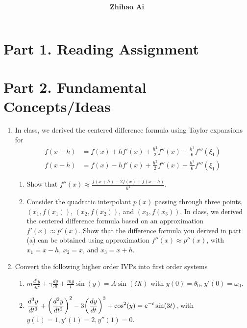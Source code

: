 \documentclass[10pt]{report}
\title{
	\vspace{2in}
	\textmd{\textbf{\hwCourse\\\hwTitle}}\\
	\vspace{0.3in}\large{\textit{\hmwkClassInstructor}}
	\vspace{3in}
}
\author{\textbf{Zhihao Ai}}
\date{}
\newcommand{\ds}{\displaystyle}
\DeclarePairedDelimiter\autoparen{(}{)}
\newcommand{\pa}[1]{\autoparen*{#1}}
\begin{document}
\maketitle

\section*{Part 1. Reading Assignment}

\section*{Part 2. Fundamental Concepts/Ideas}
\begin{enumerate}
	\item 
	In class, we derived the centered difference formula using Taylor expansions for
	\begin{align*}
		f(x+h) &= f(x) + hf'(x) + \frac{h^2}{2}f''(x) + \frac{h^3}{6}f'''(\xi_1)\\
		f(x-h) &= f(x) - hf'(x) + \frac{h^2}{2}f''(x) - \frac{h^3}{6}f'''(\xi_1)
	\end{align*}
	\begin{enumerate}
		\item 
		Show that $f''(x) \approx \frac{f(x+h) - 2f(x) + f(x-h)}{h^2}$.
		
		\item
		Consider the quadratic interpolant $p(x)$ passing through three points, $(x_1, f(x_1))$, $(x_2, f(x_2))$, and $(x_3, f(x_3))$. In class, we derived the centered
		difference formula based on an approximation $f'(x) \approx p'(x)$. Show that the difference formula you derived in part (a) can be obtained using approximation $f''(x) \approx p''(x)$, with $x_1 = x - h$, $x_2 = x$, and $x_3 = x + h$.
	\end{enumerate}

	\item 
	Convert the following higher order IVPs into first order systems
	\begin{enumerate}
		\item 
		$\ds m\frac{d^2y}{dt^2} + \gamma \frac{dy}{dt} + \frac{mg}{l} \sin(y) = A\sin(\Omega t)$ with $y(0) = \theta_0$, $y'(0) = \omega_0$.
		
		\item
		$\ds \frac{d^3y}{dt^3} + \pa{\frac{d^2y}{dt^2}}^2 - 3\pa{\frac{dy}{dt}}^3 + \cos^2(y) = e^{-t}\sin(3t)$, with $y(1) = 1, y'(1) = 2, y''(1) = 0$.
	\end{enumerate}
\end{enumerate}
\end{document}
